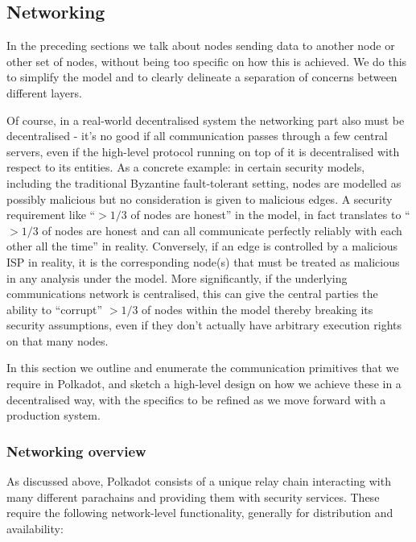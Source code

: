 \documentclass{article}
\begin{document}
\subsection{Networking}\label{sec:networking}

In the preceding sections we talk about nodes sending data to another node or
other set of nodes, without being too specific on how this is achieved. We do
this to simplify the model and to clearly delineate a separation of concerns
between different layers.

Of course, in a real-world decentralised system the networking part also must
be decentralised - it's no good if all communication passes through a few
central servers, even if the high-level protocol running on top of it is
decentralised with respect to its entities. As a concrete example: in certain
security models, including the traditional Byzantine fault-tolerant setting,
nodes are modelled as possibly malicious but no consideration is given to
malicious edges. A security requirement like “$> 1/3$ of nodes are honest” in
the model, in fact translates to “$> 1/3$ of nodes are honest and can all
communicate perfectly reliably with each other all the time” in reality.
Conversely, if an edge is controlled by a malicious ISP in reality, it is the
corresponding node(s) that must be treated as malicious in any analysis under
the model. More significantly, if the underlying communications network is
centralised, this can give the central parties the ability to “corrupt” $> 1/3$
of nodes within the model thereby breaking its security assumptions, even if
they don't actually have arbitrary execution rights on that many nodes.

In this section we outline and enumerate the communication primitives that we
require in Polkadot, and sketch a high-level design on how we achieve these in
a decentralised way, with the specifics to be refined as we move forward with a
production system.

\subsubsection{Networking overview}

As discussed above, Polkadot consists of a unique relay chain interacting with
many different parachains and providing them with security services. These
require the following network-level functionality, generally for distribution
and availability:
\end{document}
